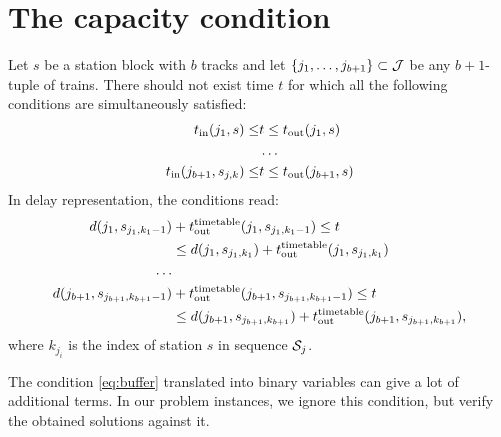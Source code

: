 \section{The capacity condition}
Let $s$ be a station block with $b$ tracks and let $\{j_{1},\ldots,j_{b+1}\} \subset \mathcal{J}$ be any $b+1$-tuple of
trains. There should not exist time $t$ for which all the following conditions are simultaneously satisfied:
\begin{equation}
  \begin{split}
    t_\text{in}(j_{1}, s) \le &t \le t_\text{out}(j_{1}, s) \\
    &\ldots \\
    t_\text{in}(j_{b+1}, s_{j,k}) \le &t \le t_\text{out}(j_{b+1}, s)
  \end{split}
\end{equation}
In delay representation, the conditions read:
\begin{equation}
  \label{eq:buffer}
  \begin{split}
    d(j_{1}, s_{j_{1},k_{1}-1}) &+ t_\text{out}^\text{timetable}(j_{1},s_{j_{1},k_{1}-1}) \le t \\
                            &\le d(j_{1},s_{j_{1},k_{1}}) + t_\text{out}^\text{timetable}(j_{1},s_{j_{1},k_{1}})\\
    \ldots \\
    d(j_{b+1}, s_{j_{b+1},k_{b+1}-1}) &+ t_\text{out}^\text{timetable}(j_{b+1},s_{j_{b+1},k_{b+1}-1}) \le t \\
                            &\le d(j_{b+1},s_{j_{b+1},k_{b+1}}) + t_\text{out}^\text{timetable}(j_{b+1},s_{j_{b+1},k_{b+1}}),
  \end{split}
\end{equation}
where $k_{j_{i}}$ is the index of station $s$ in sequence $\mathcal{S}_j$.

The condition \eqref{eq:buffer} translated into binary variables can give a lot of additional terms.
In our problem instances, we ignore this condition, but verify the obtained solutions against it.
